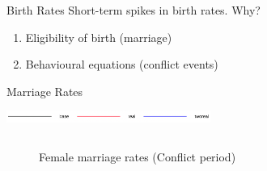 \documentclass{beamer}
\begin{document}
\begin{frame}{Birth Rates}
			Short-term spikes in birth rates. Why?
			\begin{enumerate}
				\item Eligibility of birth (marriage)
				\item Behavioural equations (conflict events)
			\end{enumerate}
		\end{frame}

		\begin{frame}{Marriage Rates}
			\begin{center}
				\includegraphics[width=0.5\textwidth]{Images/legend.png}
			\end{center}

			\begin{columns}
				\begin{column}{0.5\paperwidth}
					\begin{figure}
						\caption{Female marriage rates (Conflict period)}
					\end{figure}
				\end{column}


\end{columns}
\end{frame}
\end{document}
